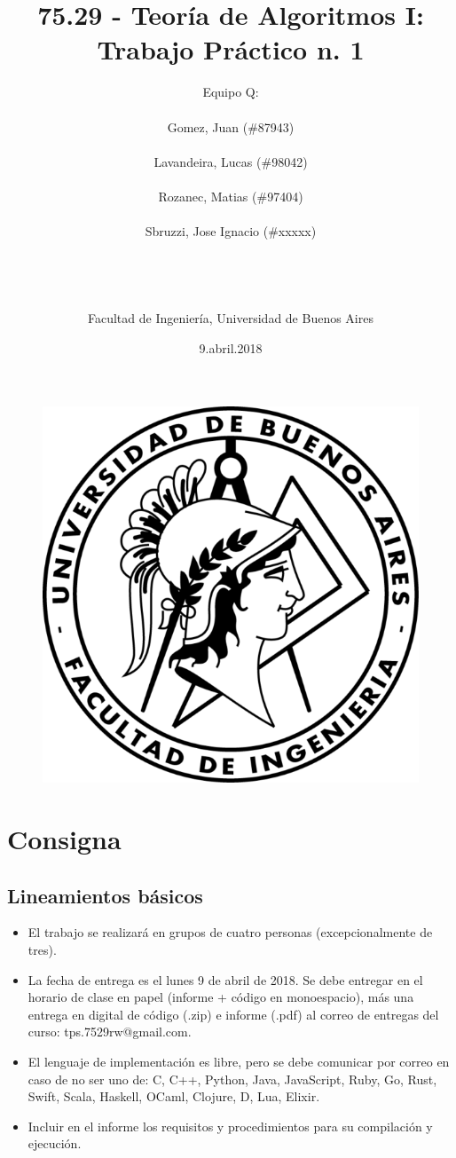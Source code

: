 \documentclass{article}
\title{75.29 - Teoría de Algoritmos I: Trabajo Práctico n. 1}
\date{9.abril.2018}
\author{
\Large{Equipo Q:}\\
\\
        Gomez, Juan (\#87943)\\
\\
        Lavandeira, Lucas (\#98042)\\
\\
        Rozanec, Matias (\#97404)\\
\\
        Sbruzzi, Jose Ignacio (\#xxxxx)\\
\\
\\
\\
\\
\normalsize{Facultad de Ingeniería, Universidad de Buenos Aires}\\
}
\begin{document}
\maketitle
\begin{figure}[!htp]
    \centering
    \includegraphics[scale=1]{fiuba_logo.png} 
\end{figure}
\thispagestyle{empty}
\newpage


\section{Consigna}
\subsection{Lineamientos básicos}
\begin{itemize}
    \item El trabajo se realizará en grupos de cuatro personas (excepcionalmente de tres).
    \item La fecha de entrega es el lunes 9 de abril de 2018. Se debe entregar en el horario de clase en papel (informe + código en monoespacio), más una entrega en digital de código (.zip) e informe (.pdf) al correo de entregas del curso: tps.7529rw@gmail.com.
    \item El lenguaje de implementación es libre, pero se debe comunicar por correo en caso de no ser uno de: C, C++, Python, Java, JavaScript, Ruby, Go, Rust, Swift, Scala, Haskell, OCaml, Clojure, D, Lua, Elixir.
    \item Incluir en el informe los requisitos y procedimientos para su compilación y ejecución.
\end{itemize}
\end{document}
